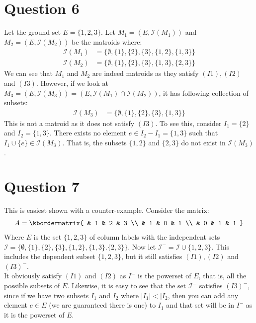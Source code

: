 \documentclass[a4paper, fleqn]{article}
\begin{document}
\section*{Question 6}
Let the ground set $E=\{1,2,3\}$. Let $M_1=(E, \mathcal{I}(M_1))$ and $M_2=(E, \mathcal{I}(M_2))$ be the matroids where:
\begin{align*}
  \mathcal{I}(M_1)&=\{\emptyset, \{1\}, \{2\}, \{3\}, \{1,2\}, \{1,3\}\} \\
  \mathcal{I}(M_2)&=\{\emptyset, \{1\}, \{2\}, \{3\}, \{1,3\}, \{2,3\}\}
\end{align*}
We can see that $M_1$ and $M_2$ are indeed matroids as they satisfy $(I1),(I2)$ and $(I3)$. However, if we look at $M_3=(E, \mathcal{I}(M_3))=(E, \mathcal{I}(M_1)\cap \mathcal{I}(M_2))$, it has following collection of subsets:
\begin{align*}
  \mathcal{I}(M_3)&=\{\emptyset, \{1\}, \{2\}, \{3\}, \{1,3\}\}
\end{align*}
This is not a matroid as it does not satisfy $(I3)$. To see this, consider $I_1=\{2\}$ and $I_2=\{1,3\}$. There exists no element $e\in I_2-I_1=\{1,3\}$ such that $I_1\cup \{e\}\in \mathcal{I}(M_3)$. That is, the subsets $\{1,2\}$ and $\{2,3\}$ do not exist in $\mathcal{I}(M_3)$.

\section*{Question 7}
This is easiest shown with a counter-example. Consider the matrix:
\begin{align*}
  A=\kbordermatrix{
    & 1 & 2 & 3 \\
    & 1 & 0 & 1 \\
    & 0 & 1 & 1
  }
\end{align*}
Where $E$ is the set $\{1,2,3\}$ of column labels with the independent sets $\mathcal{I}=\{\emptyset, \{1\}, \{2\}, \{3\}, \{1,2\}, \{1,3\}. \{2,3\}\}$. Now let $\mathcal{I}^-=\mathcal{I}\cup \{1,2,3\}$. This includes the dependent subset $\{1,2,3\}$, but it still satisfies $(I1), (I2)$ and $(I3)^-$. \\
It obviously satisfy $(I1)$ and $(I2)$ as $I^-$ is the powerset of $E$, that is, all the possible subsets of $E$. Likewise, it is easy to see that the set $\mathcal{I}^-$ satisfies $(I3)^-$, since if we have two subsets $I_1$ and $I_2$ where $|I_1|<|I_2$, then you can add any element $e\in E$ (we are guaranteed there is one) to $I_1$ and that set will be in $I^-$ as it is the powerset of $E$.
\end{document}
